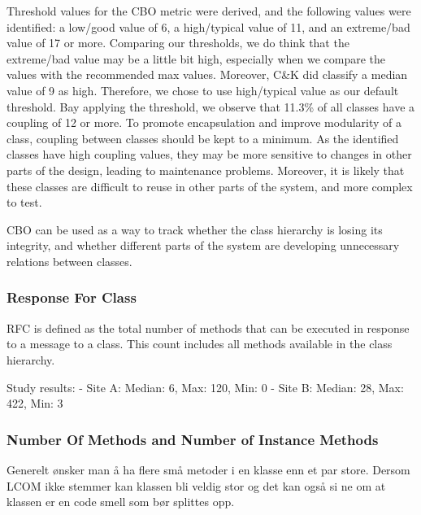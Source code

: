 Threshold values for the CBO metric were derived, and the following values were identified:  a low/good value of 6, a high/typical value of 11, and an extreme/bad value of 17 or more. Comparing our thresholds, we do think that the extreme/bad value may be a little bit high, especially when we compare the values with the recommended max values. Moreover, C\&K did classify a median value of 9 as high. Therefore, we chose to use high/typical value as our default threshold. Bay applying the threshold, we observe that 11.3\% of all classes have a coupling of 12 or more. To promote encapsulation and improve modularity of a class, coupling between classes should be kept to a minimum. As the identified classes have high coupling values, they may be more sensitive to changes in other parts of the design, leading to maintenance problems. Moreover, it is likely that these classes are difficult to reuse in other parts of the system, and more complex to test.

CBO can be used as a way to track whether the class hierarchy is losing its integrity, and whether different parts of the system are developing unnecessary relations between classes.



\subsubsection{Response For Class}
RFC is defined as the total number of methods that can be executed in response to a message to a class. This count includes all methods available in the class hierarchy. 



Study results:
- Site A: Median: 6, Max: 120, Min: 0
- Site B: Median: 28, Max: 422, Min: 3

\subsubsection{Number Of Methods and Number of Instance Methods}
Generelt ønsker man å ha flere små metoder i en klasse enn et par store. Dersom LCOM ikke stemmer kan klassen bli veldig stor og det kan også si ne om at klassen er en code smell som bør splittes opp.

